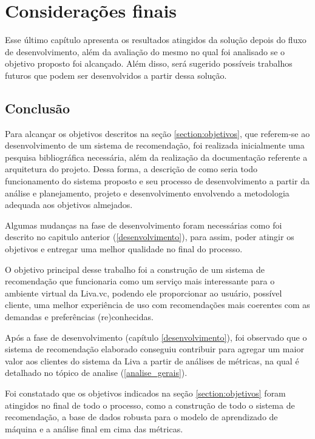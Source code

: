\chapter{Considerações finais}

Esse último capítulo apresenta os resultados atingidos da solução depois do fluxo de desenvolvimento, além da avaliação do mesmo no qual foi analisado se o objetivo proposto foi alcançado. Além disso, será sugerido possíveis trabalhos futuros que podem ser desenvolvidos a partir dessa solução.

\section{Conclusão}

Para alcançar os objetivos descritos na seção \ref{section:objetivos}, que referem-se ao desenvolvimento de um sistema de recomendação, foi realizada inicialmente uma pesquisa bibliográfica necessária, além da realização da documentação referente a arquitetura do projeto. Dessa forma, a descrição de como seria todo funcionamento do sistema proposto e seu processo de desenvolvimento a partir da análise e planejamento, projeto e desenvolvimento envolvendo a metodologia adequada aos objetivos almejados.

Algumas mudanças na fase de desenvolvimento foram necessárias como foi descrito no capitulo anterior (\ref{desenvolvimento}), para assim, poder atingir os objetivos e entregar uma melhor qualidade no final do processo.

O objetivo principal desse trabalho foi a construção de um sistema de recomendação que funcionaria como um serviço mais interessante para o ambiente virtual da Liva.vc, podendo ele proporcionar ao usuário, possível cliente, uma melhor experiência de uso com recomendações mais coerentes com as demandas e preferências (re)conhecidas.

Após a fase de desenvolvimento (capítulo \ref{desenvolvimento}), foi observado que o sistema de recomendação elaborado conseguiu contribuir para agregar um maior valor aos clientes do sistema da Liva a partir de análises de métricas, na qual é detalhado no tópico de analise (\ref{analise_gerais}).

Foi constatado que os objetivos indicados na seção \ref{section:objetivos} foram atingidos no final de todo o processo, como a construção de todo o sistema de recomendação, a base de dados robusta para o modelo de aprendizado de máquina e a análise final em cima das métricas.

